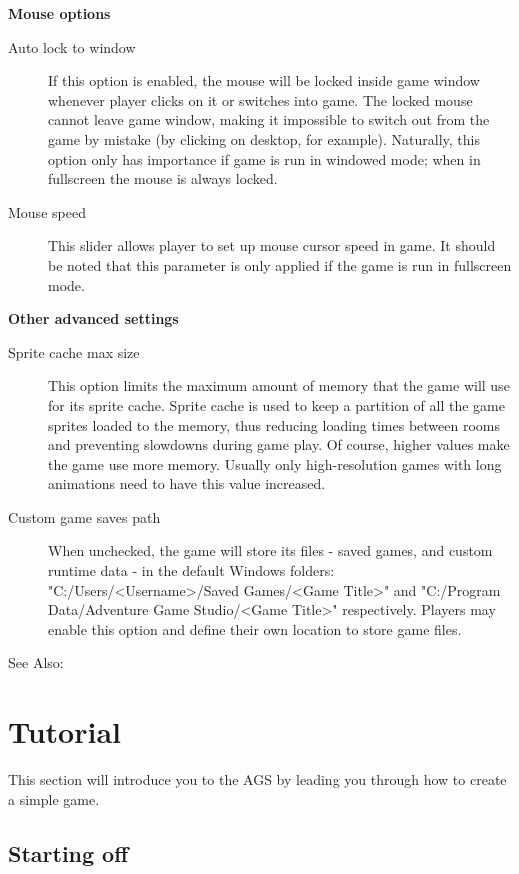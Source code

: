 \bf{Mouse options}

\begin{description}
\item [Auto lock to window]
  If this option is enabled, the mouse will be locked inside game window whenever player clicks on it or switches into game.
The locked mouse cannot leave game window, making it impossible to switch out from the game by mistake (by clicking on desktop,
for example). Naturally, this option only has importance if game is run in windowed mode; when in fullscreen the mouse is always
locked.
\item [Mouse speed]
  This slider allows player to set up mouse cursor speed in game. It should be noted that this parameter is only applied if the
game is run in fullscreen mode.
\end{description}

\bf{Other advanced settings}

\begin{description}
\item [Sprite cache max size]
  This option limits the maximum amount of memory that the game will use for its sprite cache. Sprite cache is used to
  keep a partition of all the game sprites loaded to the memory, thus reducing loading times between rooms and preventing
  slowdowns during game play.
  Of course, higher values make the game use more memory. Usually only high-resolution games with long animations need
  to have this value increased.
\item [Custom game saves path]
  When unchecked, the game will store its files - saved games, and custom runtime data -
in the default Windows folders: "C:/Users/<Username>/Saved Games/<Game Title>" and
"C:/Program Data/Adventure Game Studio/<Game Title>" respectively.
  Players may enable this option and define their own location to store game files.
\end{description}

See Also: 


\chapter{Tutorial}%

This section will introduce you to the AGS by leading you through how to
create a simple game.

\section{Starting off}\label{StartingOff}%

